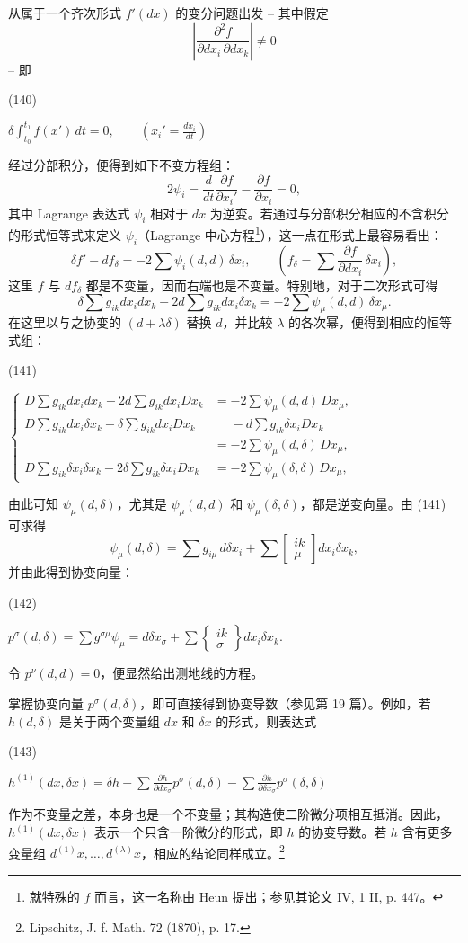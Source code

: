 \documentclass[11pt]{article}
\providecommand{\srcnumdisplay}[3][3.4em]{%
  \par\smallskip\noindent
  \begin{minipage}[t]{#1}\vspace*{0pt}#2\end{minipage}%
  \begin{minipage}[t]{\dimexpr\linewidth-#1\relax}\vspace*{0pt}\centering
  \(\displaystyle #3\)
  \end{minipage}\par\smallskip}
\begin{document}
从属于一个齐次形式 $f'(dx)$ 的变分问题出发 -- 其中假定
\[
\left|\frac{\partial^2 f}{\partial dx_i\,\partial dx_k}\right|\ne0
\]
-- 即
\srcnumdisplay{(140)}{\delta\int_{t_0}^{t_1} f(x')\,dt=0,
\qquad \left(x_i'=\frac{dx_i}{dt}\right)}
经过分部积分，便得到如下不变方程组：
\[
 2\psi_i=\frac{d}{dt}\frac{\partial f}{\partial x_i'}-\frac{\partial f}{\partial x_i}=0,
\]
其中 Lagrange 表达式 $\psi_i$ 相对于 $dx$ 为逆变。若通过与分部积分相应的不含积分的形式恒等式来定义 $\psi_i$（Lagrange 中心方程\footnote{就特殊的 $f$ 而言，这一名称由 Heun 提出；参见其论文 IV, 1 II, p. 447。}），这一点在形式上最容易看出：
\[
 \delta f'-df_\delta=-2\sum\psi_i(d,d)\,\delta x_i,
 \qquad
 \left(f_\delta=\sum\frac{\partial f}{\partial dx_i}\,\delta x_i\right),
\]
这里 $f$ 与 $df_\delta$ 都是不变量，因而右端也是不变量。特别地，对于二次形式可得
\[
 \delta\sum g_{ik}dx_i dx_k-2d\sum g_{ik}dx_i\delta x_k
 =-2\sum\psi_\mu(d,d)\,\delta x_\mu.
\]
在这里以与之协变的 $(d+\lambda\delta)$ 替换 $d$，并比较 $\lambda$ 的各次幂，便得到相应的恒等式组：
\srcnumdisplay{(141)}{\left\{
\begin{aligned}
D\sum g_{ik}dx_i dx_k-2d\sum g_{ik}dx_iDx_k
   &=-2\sum\psi_\mu(d,d)\,Dx_\mu,\\
D\sum g_{ik}dx_i\delta x_k-\delta\sum g_{ik}dx_iDx_k
   &\phantom{={}}{}-d\sum g_{ik}\delta x_iDx_k\\
   &=-2\sum\psi_\mu(d,\delta)\,Dx_\mu,\\
D\sum g_{ik}\delta x_i\delta x_k-2\delta\sum g_{ik}\delta x_iDx_k
   &=-2\sum\psi_\mu(\delta,\delta)\,Dx_\mu,
\end{aligned}
\right.}
由此可知 $\psi_\mu(d,\delta)$，尤其是 $\psi_\mu(d,d)$ 和 $\psi_\mu(\delta,\delta)$，都是逆变向量。由 (141) 可求得
\[
 \psi_\mu(d,\delta)=\sum g_{i\mu}\,d\delta x_i+
 \sum\left[\begin{smallmatrix}ik\\ \mu\end{smallmatrix}\right]dx_i\delta x_k,
\]
并由此得到协变向量：
\srcnumdisplay{(142)}{p^\sigma(d,\delta)=\sum g^{\sigma\mu}\psi_\mu
=d\delta x_\sigma+
\sum\left\{\begin{smallmatrix}ik\\ \sigma\end{smallmatrix}\right\}dx_i\delta x_k.}
令 $p^\nu(d,d)=0$，便显然给出测地线的方程。

掌握协变向量 $p^\sigma(d,\delta)$，即可直接得到协变导数（参见第 19 篇）。例如，若 $h(d,\delta)$ 是关于两个变量组 $dx$ 和 $\delta x$ 的形式，则表达式
\srcnumdisplay{(143)}{h^{(1)}(dx,\delta x)=\delta h-
\sum\frac{\partial h}{\partial dx_\sigma}p^\sigma(d,\delta)-
\sum\frac{\partial h}{\partial \delta x_\sigma}p^\sigma(\delta,\delta)}
作为不变量之差，本身也是一个不变量；其构造使二阶微分项相互抵消。因此，$h^{(1)}(dx,\delta x)$ 表示一个只含一阶微分的形式，即 $h$ 的协变导数。若 $h$ 含有更多变量组 $d^{(1)}x,\ldots,d^{(\lambda)}x$，相应的结论同样成立。\footnote{Lipschitz, J. f. Math. 72 (1870), p. 17.}
\end{document}
